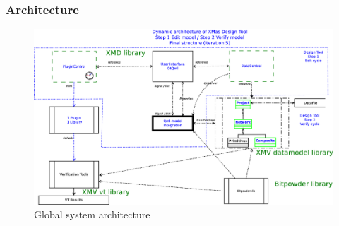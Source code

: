 \newpage
\subsubsection{Architecture}

\begin{figure}[ht]
    \includegraphics[width=\textwidth]{1c-architecture-dynamic-2}
    \caption{Global system architecture}
\end{figure}
